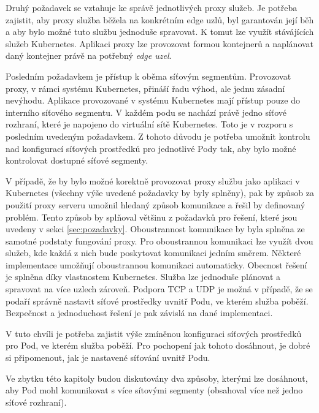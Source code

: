 Druhý požadavek se vztahuje ke správě jednotlivých proxy služeb. Je potřeba zajistit, aby proxy služba běžela na konkrétním edge uzlů, byl garantován její běh a aby bylo možné tuto službu jednoduše spravovat. K tomut lze využít stávájících služeb Kubernetes. Aplikaci proxy lze provozovat formou kontejnerů a naplánovat daný kontejner právě na potřebný \textit{edge uzel}.  

Posledním požadavkem je přístup k oběma síťovým segmentům. Provozovat proxy, v rámci systému Kubernetes, přináší řadu výhod, ale jednu zásadní nevýhodu. Aplikace provozované v systému Kubernetes mají přístup pouze do interního síťového segmentu. V každém podu se nachází právě jedno síťové rozhraní, které je napojeno do virtuální sítě Kubernetes. Toto je v rozporu s posledním uvedeným požadavkem. Z tohoto důvodu je potřeba umožnit kontrolu nad konfigurací síťových prostředků pro jednotlivé Pody tak, aby bylo možné kontrolovat dostupné síťové segmenty.

\medskip

V případě, že by bylo možné korektně provozovat proxy službu jako aplikaci v Kubernetes (všechny výše uvedené požadavky by byly splněny), pak by způsob za použití proxy serveru umožnil hledaný způsob komunikace a řešil by definovaný problém. Tento způsob by splňoval většinu z požadavků pro řešení, které jsou uvedeny v sekci \ref{sec:pozadavky}. Oboustrannost komunikace by byla splněna ze samotné podstaty fungování proxy. Pro oboustrannou komunikaci lze využít dvou služeb, kde každá z nich bude poskytovat komunikaci jedním směrem. Některé implementace umožňují oboustrannou komunikaci automaticky. Obecnost řešení je splněna díky vlastnostem Kubernetes. Služba lze jednoduše plánovat a spravovat na více uzlech zároveň. Podpora TCP a UDP je možná v případě, že se podaří správně nastavit síťové prostředky uvnitř Podu, ve kterém služba poběží. Bezpečnost a jednoduchost řešení je pak závislá na dané implementaci.

\medskip

V tuto chvíli je potřeba zajistit výše zmíněnou konfiguraci síťových prostředků pro Pod, ve kterém služba poběží. Pro pochopení jak tohoto dosáhnout, je dobré si připomenout, jak je nastavené síťování uvnitř Podu.

Ve zbytku této kapitoly budou diskutovány dva způsoby, kterými lze dosáhnout, aby Pod mohl komunikovat s více sítovými segmenty (obsahoval více než jedno síťové rozhraní).  

